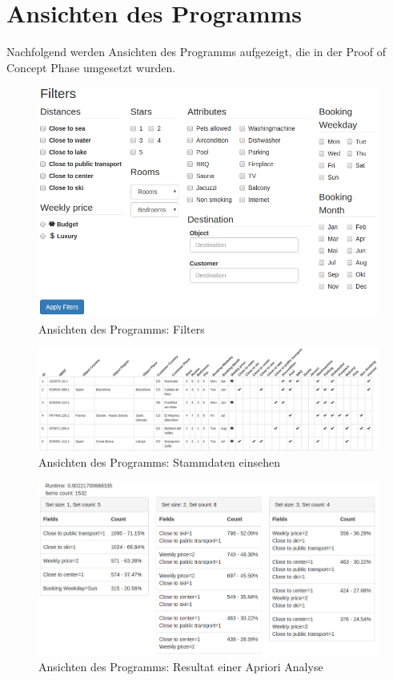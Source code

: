 \chapter{Ansichten des Programms}
Nachfolgend werden Ansichten des Programms aufgezeigt, die in der Proof of Concept Phase umgesetzt wurden.
\label{app:pocansichten}
\begin{figure}[H]
	\RawFloats
	\centering
	\includegraphics[width=1\textwidth]{images/program-filters}
	\caption{Ansichten des Programms: Filters}
\end{figure}
\begin{figure}[H]
	\RawFloats
	\centering
	\includegraphics[width=1\textwidth]{images/program-explore-results}
	\caption{Ansichten des Programms: Stammdaten einsehen}
\end{figure}
\begin{figure}[H]
	\RawFloats
	\centering
	\includegraphics[width=1\textwidth]{images/program-apriori-results}
	\caption{Ansichten des Programms: Resultat einer Apriori Analyse}
\end{figure}

